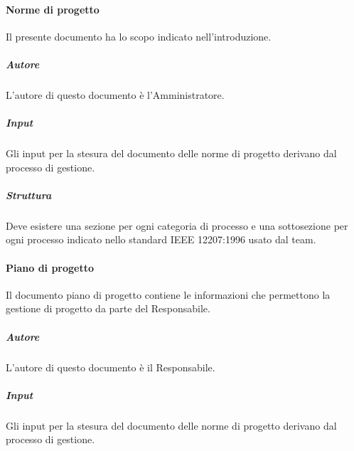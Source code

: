 \paragraph{Norme di progetto}
Il presente documento ha lo scopo indicato nell'introduzione.

\subparagraph{Autore} 
L'autore di questo documento è l'Amministratore.

\subparagraph{Input}
Gli input per la stesura del documento delle norme di progetto derivano dal processo di gestione.

\subparagraph{Struttura}
Deve esistere una sezione per ogni categoria di processo e una sottosezione per ogni processo indicato nello standard IEEE 12207:1996 usato dal team.

\paragraph{Piano di progetto}
Il documento piano di progetto contiene le informazioni che permettono la gestione di progetto da parte del Responsabile.

\subparagraph{Autore} 
L’autore di questo documento è il Responsabile.

\subparagraph{Input}
Gli input per la stesura del documento delle norme di progetto derivano dal processo di gestione.

